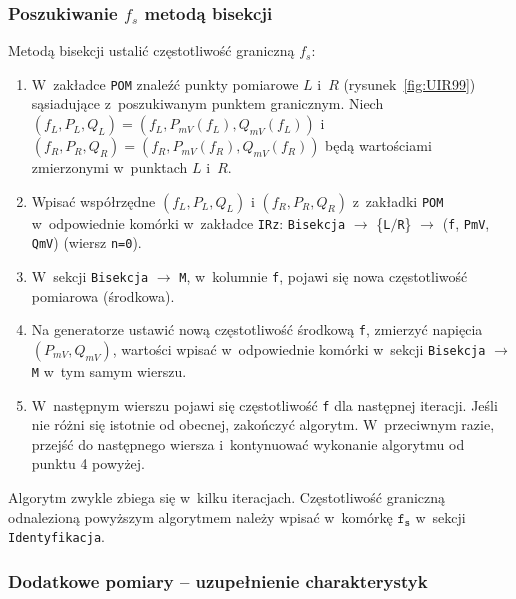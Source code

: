 \documentclass[paper=a4,DIV=12]{lpas}
\begin{document}
\subsubsection{Poszukiwanie \texorpdfstring{$f_s$}{fs} metodą bisekcji}
\label{sec:AIDQO}

Metodą bisekcji ustalić częstotliwość graniczną $f_s$:
\begin{enumerate}
  \item W~zakładce \texttt{POM} znaleźć punkty pomiarowe $L$ i~$R$
    (rysunek~\ref{fig:UIR99}) sąsiadujące z~poszukiwanym punktem granicznym.
    Niech $(f_L, P_L, Q_L) = (f_L, P_{mV}(f_L), Q_{mV}(f_L))$ i~$(f_R, P_R,
    Q_R) = (f_R, P_{mV}(f_R), Q_{mV}(f_R)) $ będą wartościami zmierzonymi
    w~punktach $L$ i~$R$.
  \item Wpisać współrzędne $(f_L, P_L, Q_L)$ i $(f_R, P_R, Q_R)$ z~zakładki
    \texttt{POM} w~odpowiednie komórki w~zakładce \texttt{IRz}:
    \texttt{Bisekcja} $\rightarrow$ \{\texttt{L}$/$\texttt{R}\} $\rightarrow$
    (\texttt{f}, \texttt{PmV}, \texttt{QmV})  (wiersz \texttt{n=0}).
  \item W~sekcji \texttt{Bisekcja} $\rightarrow$ \texttt{M}, w~kolumnie
    \texttt{f}, pojawi się nowa częstotliwość pomiarowa (środkowa).
  \item Na generatorze ustawić nową częstotliwość środkową \texttt{f}, zmierzyć
    napięcia $(P_{mV}, Q_{mV})$, wartości wpisać w~odpowiednie komórki w~sekcji
    \texttt{Bisekcja} $\rightarrow$ \texttt{M} w~tym samym wierszu.
  \item W~następnym wierszu pojawi się częstotliwość \texttt{f} dla następnej
    iteracji. Jeśli nie różni się istotnie od obecnej, zakończyć algorytm.
    W~przeciwnym razie, przejść do następnego wiersza i~kontynuować wykonanie
    algorytmu od punktu 4 powyżej.
\end{enumerate}

Algorytm zwykle zbiega się w~kilku iteracjach. Częstotliwość graniczną
odnalezioną powyższym algorytmem należy wpisać w~komórkę $\texttt{f}_\texttt{s}$ w~sekcji
\texttt{Identyfikacja}.

\subsubsection{Dodatkowe pomiary -- uzupełnienie charakterystyk}
\label{sec:4J0US}
\end{document}
